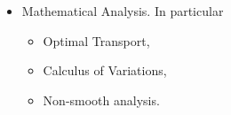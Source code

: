\begin{itemize}[noitemsep]
   \item[] Mathematical Analysis. In particular
   \begin{itemize}
      \item Optimal Transport,
      \item Calculus of Variations,
      \item Non-smooth analysis.
   \end{itemize} 
\end{itemize}
\medskip